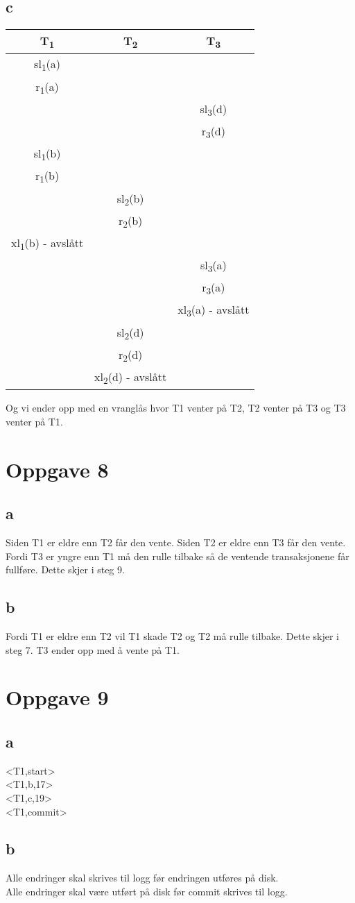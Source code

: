 \documentclass[12pt,norsk,a4paper]{article}
\begin{document}
\subsection*{c}
\begin{tabular}{c | c | c}
T\textsubscript{1} & T\textsubscript{2} & T\textsubscript{3} \\
\hline
sl\textsubscript{1}(a) & & \\
r\textsubscript{1}(a) & & \\
& & sl\textsubscript{3}(d)\\
& & r\textsubscript{3}(d)\\
sl\textsubscript{1}(b)& & \\
r\textsubscript{1}(b) & & \\
& sl\textsubscript{2}(b) & \\
& r\textsubscript{2}(b) & \\
xl\textsubscript{1}(b) - avslått & & \\
& & sl\textsubscript{3}(a)\\
& & r\textsubscript{3}(a)\\
& & xl\textsubscript{3}(a) - avslått\\
& sl\textsubscript{2}(d)& \\
& r\textsubscript{2}(d) & \\
& xl\textsubscript{2}(d) - avslått& \\
\end{tabular}

Og vi ender opp med en vranglås hvor T1 venter på T2, T2 venter på T3 og T3 venter på T1.

\section*{Oppgave 8}
\subsection*{a}
Siden T1 er eldre enn T2 får den vente. Siden T2 er eldre enn T3 får den vente. Fordi T3 er yngre enn T1 må den rulle tilbake så de ventende transaksjonene får fullføre. Dette skjer i steg 9.

\subsection*{b}
Fordi T1 er eldre enn T2 vil T1 skade T2 og T2 må rulle tilbake. Dette skjer i steg 7. T3 ender opp med å vente på T1.

\section*{Oppgave 9}
\subsection*{a}
<T1,start>\\
<T1,b,17>\\
<T1,c,19>\\
<T1,commit>

\subsection*{b}
Alle endringer skal skrives til logg før endringen utføres på disk.\\
Alle endringer skal være utført på disk før commit skrives til logg.
\end{document}

